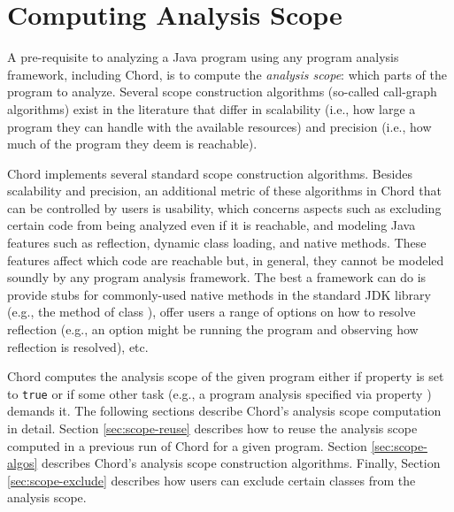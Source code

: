 \chapter{Computing Analysis Scope}
\label{chap:computing-scope}

A pre-requisite to analyzing a Java program using any program analysis framework,
including Chord, is to compute the {\it analysis scope}: which parts of the
program to analyze.  Several scope construction algorithms (so-called
call-graph algorithms) exist in the literature that differ in scalability (i.e.,
how large a program they can handle with the available resources) and precision (i.e., 
how much of the program they deem is reachable).

Chord implements several standard scope construction algorithms.  Besides scalability and precision,
an additional metric of these algorithms in Chord that can be controlled by users is usability,
which concerns aspects such as excluding certain code from being analyzed even if it
is reachable, and modeling Java features such as reflection, dynamic class loading, and native methods.
These features affect which code are
reachable but, in general, they cannot be modeled soundly by any program analysis framework.  The best
a framework can do is
 provide stubs for commonly-used native methods in the standard JDK library (e.g., the 
method of class ), 
offer users a range of options on how to resolve reflection (e.g.,
an option might be running the program and observing how reflection is resolved), etc.

Chord computes the analysis scope of the given
program either if property  is set to {\tt true} or if some other task
(e.g., a program analysis specified via property ) demands it.
The following sections describe Chord's analysis scope 
computation in detail.  Section \ref{sec:scope-reuse} describes how to reuse the analysis scope
computed in a previous run of Chord for a given program.  Section \ref{sec:scope-algos} describes
Chord's analysis scope construction algorithms.  Finally, Section \ref{sec:scope-exclude} describes how users
can exclude certain classes from the analysis scope.

